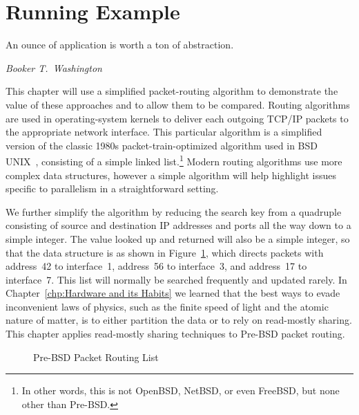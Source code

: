 \fi

\section{Running Example}
\label{sec:defer:Running Example}
%
\epigraph{An ounce of application is worth a ton of abstraction.}
	 {\emph{Booker T.~Washington}}

This chapter will use a simplified packet-routing algorithm to demonstrate
the value of these approaches and to allow them to be compared.
Routing algorithms are used in operating-system kernels to
deliver each outgoing TCP/IP packets to the appropriate network interface.
This particular algorithm is a simplified version of the classic 1980s
packet-train-optimized algorithm used in BSD UNIX~\cite{VanJacobson88},
consisting of a simple linked list.\footnote{
	In other words, this is not OpenBSD, NetBSD, or even
	FreeBSD, but none other than Pre-BSD.}
Modern routing algorithms use more complex data structures, however a
simple algorithm will help highlight issues specific to parallelism in
a straightforward setting.

We further simplify the algorithm by reducing the search key from
a quadruple consisting of source and destination IP addresses and
ports all the way down to a simple integer.
The value looked up and returned will also be a simple integer,
so that the data structure is as shown in
Figure~\ref{fig:defer:Pre-BSD Packet Routing List}, which
directs packets with address~42 to interface~1, address~56 to
interface~3, and address~17 to interface~7.
This list will normally be searched frequently and updated rarely.
In Chapter~\ref{chp:Hardware and its Habits}
we learned that the best ways to evade inconvenient laws of physics, such as
the finite speed of light and the atomic nature of matter, is to
either partition the data or to rely on read-mostly sharing.
This chapter applies read-mostly sharing techniques to Pre-BSD packet
routing.

\begin{figure}[tb]
\centering
{}
\caption{Pre-BSD Packet Routing List}
\label{fig:defer:Pre-BSD Packet Routing List}
\end{figure}

